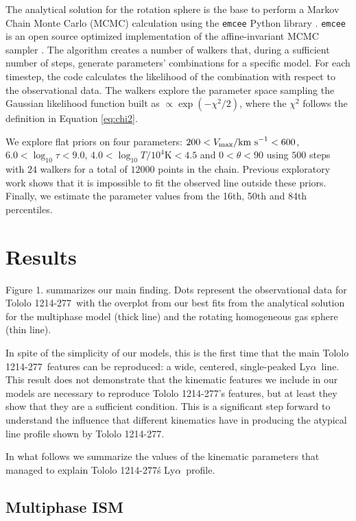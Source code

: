 \documentclass[a4,useAMS,usenatbib,usegraphicx]{mn2e}
\newcommand{\tol}{Tololo 1214-277}
\newcommand{\lya}{Ly$\alpha$}
\begin{document}
The analytical solution for the rotation sphere is the base to
perform a Markov Chain Monte Carlo (MCMC) calculation using the
\texttt{emcee} Python library \citep{2013PASP..125..306F}. \texttt{emcee} 
is an open source optimized implementation of the affine-invariant 
MCMC sampler \citep{goodman2010ensemble}. 
The algorithm creates a number of walkers that,
during a sufficient number of steps, generate parameters' combinations
for a specific model.
For each timestep, the code calculates the likelihood of the
combination with respect to the observational data.
The walkers explore the parameter space sampling the Gaussian likelihood
function built as $\propto \exp(-\chi^2/2)$, where the $\chi^2$ follows
the definition in Equation \ref{eq:chi2}. 
 

We explore flat priors on four parameters: $200<V_{\rm
  max}/\mathrm{km\ s}^{-1} <600$,   $6.0<\log_{10}\tau<9.0$,
$4.0<\log_{10} T/10^4\mathrm{K}< 4.5$ and $0<\theta<90$ using $500$
steps with $24$ walkers for a total of $12000$ points in the chain.
Previous exploratory work shows that it is impossible to fit the
observed line outside these priors.
Finally, we estimate the parameter values from the 16th, 50th and 84th
percentiles. 


\section{Results}


Figure 1. summarizes our main finding.
Dots represent the observational data for \tol\ with the
overplot from our best fits from the analytical solution for the
multiphase model (thick line)  and the rotating homogeneous gas sphere
(thin line). 

In spite of the simplicity of our models, this is the first time that
the main \tol\ features can be reproduced: a wide, centered,
single-peaked \lya\ line.
This result does not demonstrate that the kinematic features we
include in our models are necessary to reproduce \tol's features, but
at least they show that they are a sufficient condition.
This is a significant step forward to understand the influence that
different kinematics have in producing the atypical line profile shown
by \tol.

In what follows we summarize the values of the kinematic parameters
that managed to explain \tol\'s \lya\ profile.


\subsection{Multiphase ISM}
\end{document}
